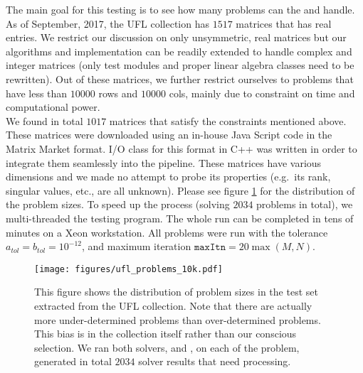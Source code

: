 \documentclass[10pt,letterpaper]{article}
\newcommand{\alg}[1]{\textproc{#1}}
\begin{document}
The main goal for this testing is to see how many problems can the
\alg{USYMLQ} and \alg{USYMQR} handle. As of September, 2017, the UFL
collection has $1517$ matrices that has real entries. We restrict our 
discussion on only unsymmetric, real matrices but our algorithms and 
implementation can be readily extended to handle complex and integer
matrices (only test modules and proper linear algebra classes need to 
be rewritten).  Out of these matrices, we further restrict ourselves 
to problems that have less than $10000$ rows and $10000$ cols, mainly 
due to constraint on time and computational power. \\

We found in total $1017$ matrices that satisfy the constraints mentioned
above. These matrices were downloaded using an in-house Java
Script code in the Matrix Market format. I/O class for this format
in C++ was written in order to integrate them seamlessly into the 
pipeline. These matrices have various dimensions and we made no
attempt to probe its properties (e.g.~its rank, singular values, etc.,
are all unknown). Please see figure \ref{fig:ufl_size} for the distribution
of the problem sizes. To speed up the process (solving $2034$ problems
in total), we multi-threaded the testing program. The whole run can 
be completed in tens of minutes on a Xeon workstation. All problems were run
with the tolerance $a_{tol} = b_{tol} = 10^{-12}$, and maximum iteration 
$\texttt{maxItn} = 20\max(M,N)$. 

\begin{figure}[H]
    \centering
    \texttt{[image: figures/ufl\_problems\_10k.pdf]}
    \caption{This figure shows the distribution of problem sizes in the
             test set extracted from the UFL collection. Note that there
             are actually more under-determined problems than 
             over-determined problems. This bias is in the collection
             itself rather than our conscious selection. We ran both
             solvers, \alg{USYMLQ} and \alg{USYMQR}, on each of the 
             problem, generated in total $2034$ solver results that
             need processing.}
    \label{fig:ufl_size}
\end{figure}
\end{document}
